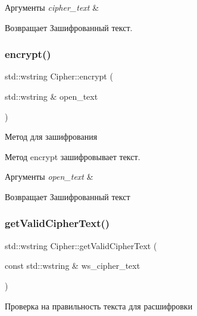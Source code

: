 \begin{DoxyParams}{Аргументы}
{\em cipher\+\_\+text} & \\
\hline
\end{DoxyParams}
\begin{DoxyReturn}{Возвращает}
Зашифрованный текст. 
\end{DoxyReturn}
\mbox{\label{classCipher_aebf6146bc7bb26d9b934ced49ed6dd19}} 
\subsubsection{\texorpdfstring{encrypt()}{encrypt()}}
{\footnotesize\ttfamily std\+::wstring Cipher\+::encrypt (\begin{DoxyParamCaption}\item[{std\+::wstring \&}]{open\+\_\+text }\end{DoxyParamCaption})}



Метод для зашифрования 

Метод encrypt зашифровывает текст.


\begin{DoxyParams}{Аргументы}
{\em open\+\_\+text} & \\
\hline
\end{DoxyParams}
\begin{DoxyReturn}{Возвращает}
Зашифрованный текст 
\end{DoxyReturn}
\mbox{\label{classCipher_ab0e1d86022b18c1bec07cde229ba87e6}} 
\subsubsection{\texorpdfstring{get\+Valid\+Cipher\+Text()}{getValidCipherText()}}
{\footnotesize\ttfamily std\+::wstring Cipher\+::get\+Valid\+Cipher\+Text (\begin{DoxyParamCaption}\item[{const std\+::wstring \&}]{ws\+\_\+cipher\+\_\+text }\end{DoxyParamCaption})\hspace{0.3cm}{\ttfamily [inline]}}



Проверка на правильность текста для расшифровки 

